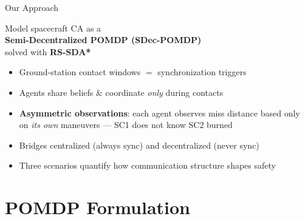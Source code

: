 \documentclass[aspectratio=169]{beamer}
\begin{document}
\begin{frame}{Our Approach}
  \begin{center}
    \large
    Model spacecraft CA as a\\[0.5em]
    \textbf{Semi-Decentralized POMDP (SDec-POMDP)}\\[0.5em]
    solved with \textbf{RS-SDA*}
  \end{center}
  \vspace{1em}
  \begin{itemize}
    \item Ground-station contact windows $=$ synchronization triggers
    \item Agents share beliefs \& coordinate \emph{only} during contacts
    \item \textbf{Asymmetric observations}: each agent observes miss distance
          based only on \emph{its own} maneuvers --- SC1 does not know SC2 burned
    \item Bridges centralized (always sync) and decentralized (never sync)
    \item Three scenarios quantify how communication structure shapes safety
  \end{itemize}
\end{frame}

\section{POMDP Formulation}
\end{document}
